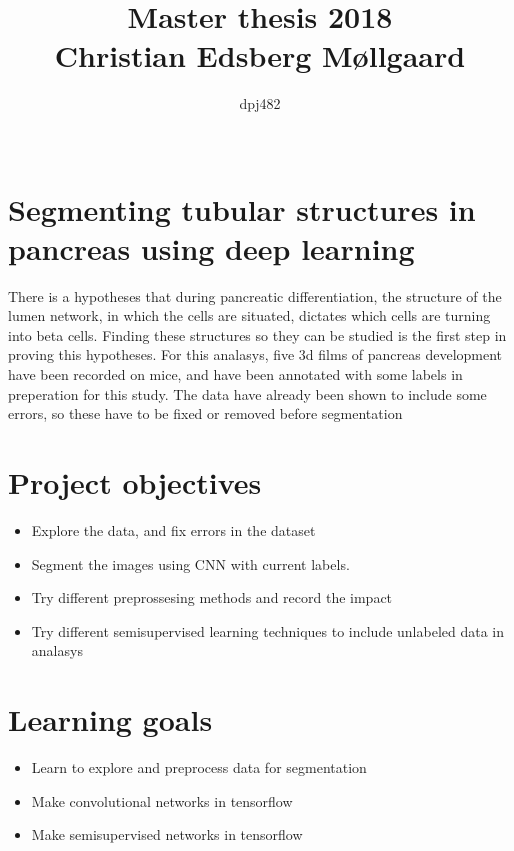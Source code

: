 \documentclass{article}
\author{
\Large{dpj482}\\
    \\ \texttt{}
}
\title{
  \vspace{3cm}
  \Huge{Master thesis 2018} \\
  \Large{Christian Edsberg Møllgaard}
}
\begin{document}


\clearpage\maketitle
\thispagestyle{empty}


\section*{Segmenting tubular structures in pancreas using deep learning} %
\label{sec:title}
There is a hypotheses that during pancreatic differentiation, the structure of
the lumen network, in which the cells are situated, dictates which cells are
turning into beta cells.
Finding these structures so they can be studied is the first step in proving
this hypotheses.
For this analasys, five 3d films of pancreas development have been recorded on
mice, and have been annotated with some labels in preperation for this study.
The data have already been shown to include some errors, so these have to be
fixed or removed before segmentation

\section*{Project objectives} %
\label{sec:project_goal}
\begin{itemize}
    \item Explore the data, and fix errors in the dataset
    \item Segment the images using CNN with current labels.
    \item Try different preprossesing methods and record the impact
    \item Try different semisupervised learning techniques to include unlabeled
    data in analasys
\end{itemize}



\section*{Learning goals}

\begin{itemize}
    \item Learn to explore and preprocess data for segmentation
    \item Make convolutional networks in tensorflow
    \item Make semisupervised networks in tensorflow
    
\end{itemize}
\end{document}

